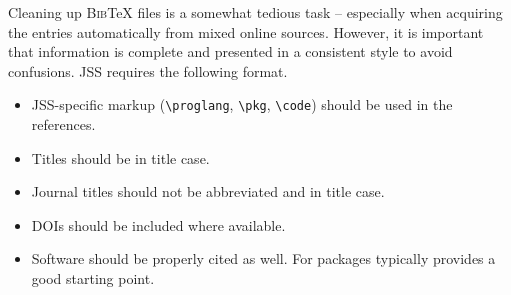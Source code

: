 \documentclass[article]{jss}
\begin{document}
\begin{appendix}
\begin{leftbar}
Cleaning up \textsc{Bib}{\TeX} files is a somewhat tedious task -- especially
when acquiring the entries automatically from mixed online sources. However,
it is important that information is complete and presented in a consistent
style to avoid confusions. JSS requires the following format.
\begin{itemize}
  \item JSS-specific markup (\verb|\proglang|, \verb|\pkg|, \verb|\code|) should
    be used in the references.
  \item Titles should be in title case.
  \item Journal titles should not be abbreviated and in title case.
  \item DOIs should be included where available.
  \item Software should be properly cited as well. For  packages
     typically provides a good starting point.
\end{itemize}
\end{leftbar}

\end{appendix}

\end{document}
